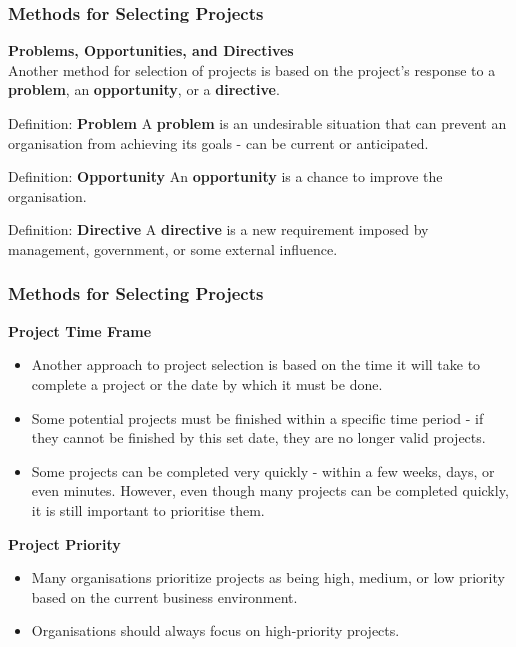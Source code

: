 \documentclass[aspectratio=169]{beamer}
\begin{document}
\begin{frame}
\frametitle{Methods for Selecting Projects}
\textbf{Problems, Opportunities, and Directives}\\
\vspace{0.3cm}
Another method for selection of projects is based on the project's response to a \textbf{problem}, an \textbf{opportunity}, or a \textbf{directive}.
\vspace{0.1cm}
\begin{block}{Definition: \textbf{Problem}}
A \textbf{problem} is an undesirable situation that can prevent an organisation from achieving its goals - can be current or anticipated.
\end{block}
\vspace{0.1cm}
\begin{block}{Definition: \textbf{Opportunity}}
An \textbf{opportunity} is a chance to improve the organisation.
\end{block}
\vspace{0.1cm}
\begin{block}{Definition: \textbf{Directive}}
A \textbf{directive} is a new requirement imposed by management, government, or some external influence.
\end{block}
\end{frame}

\begin{frame}
\frametitle{Methods for Selecting Projects}
\textbf{Project Time Frame}
\vspace{0.1cm}
\begin{itemize}
\item Another approach to project selection is based on the time it will take to complete a project or the date by which it must be done.
\item Some potential projects must be finished within a specific time period - if they cannot be finished by this set date, they are no longer valid projects.
\item Some projects can be completed very quickly - within a few weeks, days, or even minutes. However, even though many projects can be completed quickly, it is still important to prioritise them.
\end{itemize}
\vspace{0.5cm}
\textbf{Project Priority}
\vspace{0.1cm}
\begin{itemize}
\item Many organisations prioritize projects as being high, medium, or low priority based on the current business environment.
\item Organisations should always focus on high-priority projects.
\end{itemize}
\end{frame}
\end{document}

